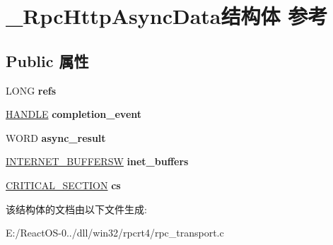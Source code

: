 \hypertarget{struct___rpc_http_async_data}{}\section{\+\_\+\+Rpc\+Http\+Async\+Data结构体 参考}
\label{struct___rpc_http_async_data}
\subsection*{Public 属性}
\begin{DoxyCompactItemize}
\item 
\mbox{\label{struct___rpc_http_async_data_ab40a1ca8eb7a3e2f844882c42f67501b}} 
L\+O\+NG {\bfseries refs}
\item 
\mbox{\label{struct___rpc_http_async_data_a46a21561d9264526ac6baa67c826b39d}} 
\hyperlink{interfacevoid}{H\+A\+N\+D\+LE} {\bfseries completion\+\_\+event}
\item 
\mbox{\label{struct___rpc_http_async_data_a73a83e20fd39474ee9f6b0c2c4bc3da1}} 
W\+O\+RD {\bfseries async\+\_\+result}
\item 
\mbox{\label{struct___rpc_http_async_data_a0a9f0dab54508103ad4fa79e2d3cef06}} 
\hyperlink{struct___i_n_t_e_r_n_e_t___b_u_f_f_e_r_s_w}{I\+N\+T\+E\+R\+N\+E\+T\+\_\+\+B\+U\+F\+F\+E\+R\+SW} {\bfseries inet\+\_\+buffers}
\item 
\mbox{\label{struct___rpc_http_async_data_a1e6ae692cb7329681bef4d91ff81355d}} 
\hyperlink{struct___c_r_i_t_i_c_a_l___s_e_c_t_i_o_n}{C\+R\+I\+T\+I\+C\+A\+L\+\_\+\+S\+E\+C\+T\+I\+ON} {\bfseries cs}
\end{DoxyCompactItemize}


该结构体的文档由以下文件生成\+:\begin{DoxyCompactItemize}
\item 
E\+:/\+React\+O\+S-\/0../dll/win32/rpcrt4/rpc\+\_\+transport.\+c\end{DoxyCompactItemize}
